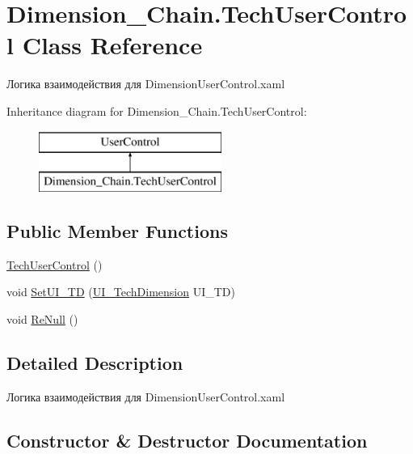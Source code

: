 \hypertarget{class_dimension___chain_1_1_tech_user_control}{}\section{Dimension\+\_\+\+Chain.\+Tech\+User\+Control Class Reference}
\label{class_dimension___chain_1_1_tech_user_control}


Логика взаимодействия для Dimension\+User\+Control.\+xaml  


Inheritance diagram for Dimension\+\_\+\+Chain.\+Tech\+User\+Control\+:\begin{figure}[H]
\begin{center}
\leavevmode
\includegraphics[height=2.000000cm]{class_dimension___chain_1_1_tech_user_control}
\end{center}
\end{figure}
\subsection*{Public Member Functions}
\begin{DoxyCompactItemize}
\item 
\mbox{\hyperlink{class_dimension___chain_1_1_tech_user_control_ae271e2a4e73a066d449e8653dbaf3ce1}{Tech\+User\+Control}} ()
\item 
void \mbox{\hyperlink{class_dimension___chain_1_1_tech_user_control_ae876b7a21937a3221ab9562fa5f30465}{Set\+U\+I\+\_\+\+TD}} (\mbox{\hyperlink{class_dimension___chain_1_1_u_i___tech_dimension}{U\+I\+\_\+\+Tech\+Dimension}} U\+I\+\_\+\+TD)
\item 
void \mbox{\hyperlink{class_dimension___chain_1_1_tech_user_control_a339e3419d46f0cda9188b3335ff57f4d}{Re\+Null}} ()
\end{DoxyCompactItemize}


\subsection{Detailed Description}
Логика взаимодействия для Dimension\+User\+Control.\+xaml 



\subsection{Constructor \& Destructor Documentation}
\mbox{\label{class_dimension___chain_1_1_tech_user_control_ae271e2a4e73a066d449e8653dbaf3ce1}} 
